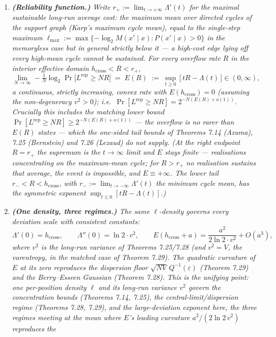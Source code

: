 \documentclass[
]{article}
\begin{document}
\begin{enumerate}
\item \emph{\textbf{(Reliability function.)} Write $r_+:=\lim_{t\to+\infty}\Lambda'(t)$
for the maximal \emph{sustainable} long-run average cost: the maximum mean over
directed cycles of the support graph (Karp's maximum cycle mean), equal to the
single-step maximum $\ell_{\max}:=\max\{-\log_2 M(x'\mid x):P(x'\mid x)>0\}$ in the
memoryless case but in general strictly below it --- a high-cost edge lying off every
high-mean cycle cannot be sustained. For every overflow rate $R$ in the interior
effective domain $h_{\mathrm{cross}}<R<r_+$,}
\[
  \lim_{N\to\infty}-\tfrac1N\log_2\Pr\!\bigl[L^{\mathrm{rep}}\ge NR\bigr]
  \;=\; E(R)\;:=\;\sup_{t\ge0}\,\bigl[\,tR-\Lambda(t)\,\bigr]\in(0,\infty),
\]
\emph{a continuous, strictly increasing, convex rate with $E(h_{\mathrm{cross}})=0$
(assuming the non-degeneracy $v^2>0$); i.e.\
$\Pr[L^{\mathrm{rep}}\ge NR]=2^{-N(E(R)+o(1))}$. Crucially this includes the
matching \emph{lower} bound $\Pr[L^{\mathrm{rep}}\ge NR]\ge 2^{-N(E(R)+o(1))}$ ---
the overflow is no rarer than $E(R)$ states --- which the one-sided tail bounds
of Theorems 7.14 (Azuma), 7.25 (Bernstein) and 7.26 (Lezaud) do \emph{not}
supply. (At the right endpoint $R=r_+$ the supremum is the $t\to\infty$ limit and
$E$ stays finite --- realisations concentrating on the maximum-mean cycle; for
$R>r_+$ no realisation sustains that average, the event is impossible, and
$E\equiv+\infty$. The lower tail $r_-<R<h_{\mathrm{cross}}$, with
$r_-:=\lim_{t\to-\infty}\Lambda'(t)$ the minimum cycle mean, has the symmetric
exponent $\sup_{t\le0}[tR-\Lambda(t)]$.)}
\item \emph{\textbf{(One density, three regimes.)} The same $\ell$-density governs
every deviation scale with consistent constants:}
\[
  \Lambda'(0)=h_{\mathrm{cross}},\qquad
  \Lambda''(0)=\ln2\cdot v^2,\qquad
  E(h_{\mathrm{cross}}+a)=\frac{a^2}{2\ln2\cdot v^2}+O(a^3),
\]
\emph{where $v^2$ is the long-run variance of Theorems 7.25/7.28 (and $v^2=V$, the
varentropy, in the matched case of Theorem 7.29). The quadratic curvature of $E$
at its zero \emph{reproduces} the dispersion floor $\sqrt{NV}\,Q^{-1}(\varepsilon)$
(Theorem 7.29) and the Berry--Esseen Gaussian (Theorem 7.28). This is the unifying
point: one per-position density $\ell$ and its long-run variance $v^2$ govern the
concentration bounds (Theorems 7.14, 7.25), the central-limit/dispersion regime
(Theorems 7.28, 7.29), and the large-deviation exponent here, the three regimes
meeting at the mean where $E$'s leading curvature $a^2/(2\ln2\,v^2)$ reproduces the
}
\end{enumerate}
\end{document}
